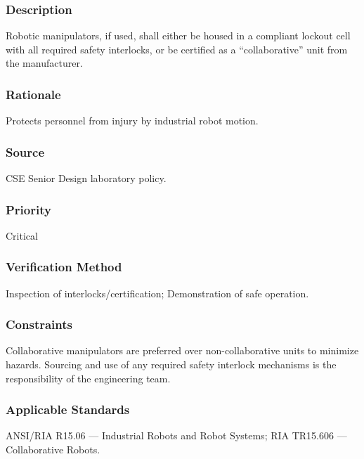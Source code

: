 \subsubsection{Description}
Robotic manipulators, if used, shall either be housed in a compliant lockout cell with all required safety interlocks, or be certified as a ``collaborative'' unit from the manufacturer.
\subsubsection{Rationale}
Protects personnel from injury by industrial robot motion.
\subsubsection{Source}
CSE Senior Design laboratory policy.
\subsubsection{Priority}
Critical
\subsubsection{Verification Method}
Inspection of interlocks/certification; Demonstration of safe operation.
\subsubsection{Constraints}
Collaborative manipulators are preferred over non-collaborative units to minimize hazards. Sourcing and use of any required safety interlock mechanisms is the responsibility of the engineering team.
\subsubsection{Applicable Standards}
ANSI/RIA R15.06 --- Industrial Robots and Robot Systems; RIA TR15.606 --- Collaborative Robots.
